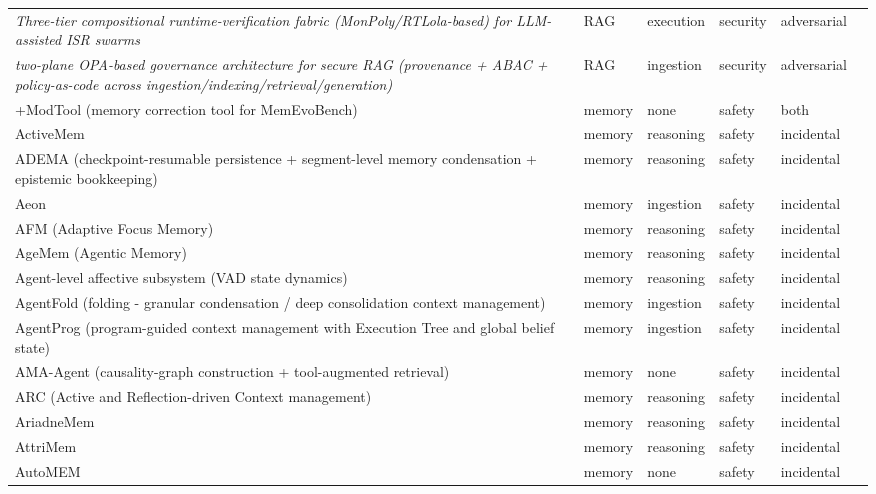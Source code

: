 \begin{longtable}{@{}p{}lllll@{}}
\emph{Three-tier compositional runtime-verification fabric (MonPoly/RTLola-based) for LLM-assisted ISR swarms} & RAG & execution & security & adversarial & \cite{kekatos-2026-missionlevel} \\
\emph{two-plane OPA-based governance architecture for secure RAG (provenance + ABAC + policy-as-code across ingestion/indexing/retrieval/generation)} & RAG & ingestion & security & adversarial & \cite{boggarapu-2026-secure} \\
+ModTool (memory correction tool for MemEvoBench) & memory & none & safety & both & \cite{xie-2026-memevobench} \\
ActiveMem & memory & reasoning & safety & incidental & \cite{jiang-2026-activemem} \\
ADEMA (checkpoint-resumable persistence + segment-level memory condensation + epistemic bookkeeping) & memory & reasoning & safety & incidental & \cite{zhou-2026-adema} \\
Aeon & memory & ingestion & safety & incidental & \cite{arslan-2026-aeon} \\
AFM (Adaptive Focus Memory) & memory & reasoning & safety & incidental & \cite{cruz-2025-adaptive} \\
AgeMem (Agentic Memory) & memory & reasoning & safety & incidental & \cite{yu-2026-agentic} \\
Agent-level affective subsystem (VAD state dynamics) & memory & reasoning & safety & incidental & \cite{subaharan-2026-controlling} \\
AgentFold (folding - granular condensation / deep consolidation context management) & memory & ingestion & safety & incidental & \cite{ye-2025-agentfold} \\
AgentProg (program-guided context management with Execution Tree and global belief state) & memory & ingestion & safety & incidental & \cite{tian-2025-agentprog} \\
AMA-Agent (causality-graph construction + tool-augmented retrieval) & memory & none & safety & incidental & \cite{zhao-2026-amabench} \\
ARC (Active and Reflection-driven Context management) & memory & reasoning & safety & incidental & \cite{yao-2026-arc} \\
AriadneMem & memory & reasoning & safety & incidental & \cite{zhu-2026-ariadnemem} \\
AttriMem & memory & reasoning & safety & incidental & \cite{li-2026-attrimem} \\
AutoMEM & memory & none & safety & incidental & \cite{chen-2026-exploring} \\

\end{longtable}
